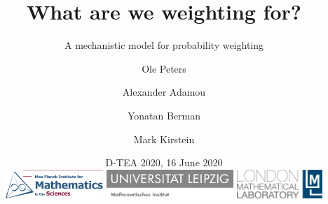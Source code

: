 \title[\insertlogo\\
\vspace{.5em}
\lmlblue{Mark Kirstein}]{\textbf{
What are we weighting for?
}}
\subtitle{A mechanistic model for probability weighting}


\author[M Kirstein]{
Ole Peters \and Alexander Adamou \and Yonatan Berman \and Mark Kirstein\\
\vspace{.5em}
}

\date[16 June 2020]{
D-TEA 2020, 16 June 2020\\
\vspace{.5cm}
\href{https://www.mis.mpg.de/jjost/research/economics.html}{\includegraphics[height=1.1cm]{img/MPIMIS_en.png}}
\hfill
\href{https://www.math.uni-leipzig.de/cms/de/forschung/abteilungen/wima/}{\includegraphics[height=1.1cm]{img/Uni_Leipzig_MathemInstitut.jpg}}
\hfill
\href{http://lml.org.uk}{
\includegraphics[height=1.1cm]{img/LML_LOGO_whiteBG.jpg}}
}
